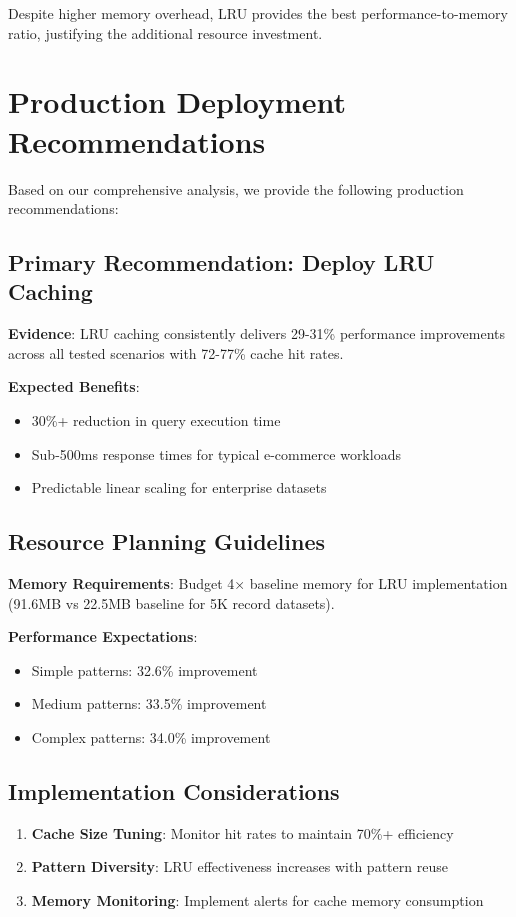 \documentclass[conference]{IEEEtran}
\begin{document}
Despite higher memory overhead, LRU provides the best performance-to-memory ratio, justifying the additional resource investment.

\section{Production Deployment Recommendations}

Based on our comprehensive analysis, we provide the following production recommendations:

\subsection{Primary Recommendation: Deploy LRU Caching}

\textbf{Evidence}: LRU caching consistently delivers 29-31\% performance improvements across all tested scenarios with 72-77\% cache hit rates.

\textbf{Expected Benefits}:
\begin{itemize}
\item 30\%+ reduction in query execution time
\item Sub-500ms response times for typical e-commerce workloads
\item Predictable linear scaling for enterprise datasets
\end{itemize}

\subsection{Resource Planning Guidelines}

\textbf{Memory Requirements}: Budget 4× baseline memory for LRU implementation (91.6MB vs 22.5MB baseline for 5K record datasets).

\textbf{Performance Expectations}: 
\begin{itemize}
\item Simple patterns: 32.6\% improvement
\item Medium patterns: 33.5\% improvement  
\item Complex patterns: 34.0\% improvement
\end{itemize}

\subsection{Implementation Considerations}

\begin{enumerate}
\item \textbf{Cache Size Tuning}: Monitor hit rates to maintain 70\%+ efficiency
\item \textbf{Pattern Diversity}: LRU effectiveness increases with pattern reuse
\item \textbf{Memory Monitoring}: Implement alerts for cache memory consumption
\end{enumerate}
\end{document}
